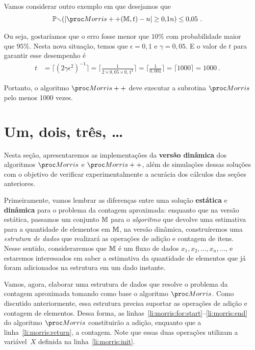 Vamos considerar outro exemplo em que desejamos que
\[ \Pbb(|\Morrispp(\Mbb, t) - n| \geq 0{,}1n) \leq 0{,}05 \ . \]

Ou seja, gostaríamos que o erro fosse menor que $10\%$ com probabilidade maior que $95\%$. Nesta nova situação, temos 
que $\epsilon = 0{,}1$ e $\gamma = 0{,}05$. E o valor de $t$ para garantir esse desempenho é
\begin{align}
  t &= \lceil (2\gamma\epsilon^2)^{-1}\rceil = \bigg\lceil \frac{1}{2 \times 0{,}05 \times 0,1^2}\bigg\rceil = 
  \bigg\lceil \frac{1}{0{,}001} \bigg\rceil = \lceil 1000 \rceil = 1000 \ . \label{morris:plus:expected_result} 
\end{align}

Portanto, o algoritmo $\Morrispp$ deve executar a subrotina $\Morris$ pelo menos 1000 vezes.

\section{Um, dois, três, \dots}
\label{chap:morris:experiments}

Nesta seção, apresentaremos as implementações da \textbf{versão dinâmica} dos algoritmos $\Morris$ e $\Morrispp$, além
de simulações dessas soluções com o objetivo de verificar experimentalmente a acurácia dos cálculos das seções 
anteriores.

Primeiramente, vamos lembrar as diferenças entre uma solução \textbf{estática} e \textbf{dinâmica} para o problema da 
contagem aproximada: enquanto que na versão estática, passamos um conjunto $\mathbb{M}$ para o \textit{algoritmo} que devolve 
uma estimativa para a quantidade de elementos em $\mathbb{M}$, na versão dinâmica, construíremos uma 
\textit{estrutura de dados} que realizará as operações de adição e contagem de itens. Nesse sentido, consideraremos 
que $\mathbb{M}$ é um fluxo de dados $x_1, x_2, \dots, x_n, \dots$, e estaremos interessados em saber a estimativa da 
quantidade de elementos que já foram adicionados na estrutura em um dado instante.

Vamos, agora, elaborar uma estrutura de dados que resolve o problema da contagem aproximada tomando como base o 
algoritmo $\Morris$. Como discutido anteriormente, essa estrutura precisa suportar as operações de adição e contagem de 
elementos. Dessa forma, as linhas~\ref{li:morris:for:start}--\ref{li:morris:end} do algoritmo $\Morris$ constituirão a 
adição, enquanto que a linha~\ref{li:morris:return}, a contagem. Note que essas duas operações utilizam a variável~$X$ 
definida na linha~\ref{li:morris:init}.

